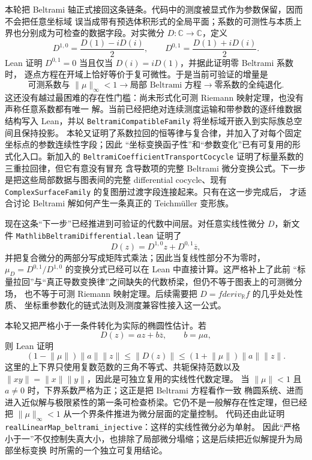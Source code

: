 \documentclass[UTF8,fontset=none,a4paper,11pt]{ctexart}
\begin{document}
本轮把 Beltrami 轴正式接回这条链条。代码中的测度被显式作为参数保留，因而不会把任意坐标域
误当成带有预选体积形式的全局平面；系数的可测性与本质上界也分别成为可检查的数据字段。对实微分
\(D:\mathbb C\to\mathbb C\)，定义
\[
 D^{1,0}=\frac{D(1)-iD(i)}2,
 \qquad
 D^{0,1}=\frac{D(1)+iD(i)}2.
\]
Lean 证明 $D^{0,1}=0$ 当且仅当 $D(i)=iD(1)$，并据此证明零 Beltrami 系数时，
逐点方程在开域上恰好等价于复可微性。于是当前可验证的增量是
\[
\text{可测系数与 }\|\mu\|_\infty<1
\to
\text{局部 Beltrami 方程}
\to
\text{零系数的全纯退化}.
\]
这还没有越过最困难的存在性门槛：尚未形式化可测 Riemann 映射定理，也没有声称任意系数都有唯一
解。当前已经把绝对连续测度运输和带参数的逐纤维数据结构写入 Lean，并以
\texttt{BeltramiCompatibleFamily} 将坐标域开嵌入到实际族总空间且保持投影。
本轮又证明了系数拉回的恒等律与复合律，并加入了对每个固定坐标点的参数连续性字段；因此
“坐标变换函子性”和“参数变化”已有可复用的形式化入口。新加入的
\texttt{BeltramiCoefficientTransportCocycle} 证明了标量系数的三重拉回律，但它有意没有冒充
含导数项的完整 Beltrami 微分变换公式。下一步是把这些局部数据与图表间的完整 differential
cocycle、现有 \texttt{ComplexSurfaceFamily} 的复图册过渡字段连接起来。只有在这一步完成后，
才适合讨论 Beltrami 解如何产生一条真正的 Teichmüller 变形族。

现在这条“下一步”已经推进到可验证的代数中间层。对任意实线性微分 \(D\)，新文件
\texttt{MathlibBeltramiDifferential}\allowbreak\texttt{.lean} 证明了
\[
D(z)=D^{1,0}z+D^{0,1}\overline z,
\]
并把复合微分的两部分写成矩阵式乘法；因此当复线性部分不为零时，
\(\mu_D=D^{0,1}/D^{1,0}\) 的变换分式已经可以在 Lean 中直接计算。这严格补上了此前
“标量拉回”与“真正导数变换律”之间缺失的代数桥梁，但仍不等于图表上的可测微分场，
也不等于可测 Riemann 映射定理。后续需要把 \(D=fderiv_{\mathbb R}f\) 的几乎处处性质、
坐标重参数化的链式法则及测度兼容性接入这一公式。

本轮又把严格小于一条件转化为实际的椭圆性估计。若
\[
 D(z)=az+b\overline z,\qquad b=\mu a,
\]
则 Lean 证明
\[
 (1-\lVert\mu\rVert)\lVert a\rVert\lVert z\rVert
 \leq \lVert D(z)\rVert
 \leq (1+\lVert\mu\rVert)\lVert a\rVert\lVert z\rVert.
\]
这里的上下界只使用复数范数的三角不等式、共轭保持范数以及
\(\lVert xy\rVert=\lVert x\rVert\lVert y\rVert\)，因此是可独立复用的实线性代数定理。
当 \(\lVert\mu\rVert<1\) 且 \(a\ne0\) 时，下界系数严格为正；这正是把 Beltrami 方程看作一致
椭圆系统、进而进入近似解与极限紧性的第一条可检查桥梁。它仍不是一般解存在性定理，但已经把
\(\lVert\mu\rVert_\infty<1\) 从一个界条件推进为微分层面的定量控制。
代码还由此证明 \texttt{realLinearMap\_beltrami\_injective}：这样的实线性微分必为单射。
因此“严格小于一”不仅控制失真大小，也排除了局部微分塌缩；这是后续把近似解提升为局部坐标变换
时所需的一个独立可复用结论。
\end{document}
